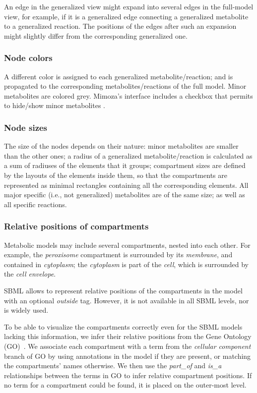 \documentclass{bmcart}
\begin{document}
An edge in the generalized view might expand into several edges in the full-model view, for example, if it is a generalized edge connecting a generalized metabolite to a generalized reaction. The positions of the edges after such an expansion might slightly differ from the corresponding generalized one.

\subsubsection*{Node colors}

A different color is assigned to each generalized metabolite/reaction; and is propagated to the corresponding metabolites/reactions of the full model. Minor metabolites are colored grey. Mimoza's interface includes a checkbox that permits to hide/show minor metabolites .

\subsubsection*{Node sizes}

The size of the nodes depends on their nature: minor metabolites are smaller than the other ones; a radius of a generalized metabolite/reaction is calculated as a sum of radiuses of the elements that it groups; compartment sizes are defined by the layouts of the elements inside them, so that the compartments are represented as minimal rectangles containing all the corresponding elements. All major specific (i.e., not generalized) metabolites are of the same size; as well as all specific reactions.

\subsubsection*{Relative positions of compartments}
Metabolic models may include several compartments, nested into each other. For example, the \emph{peroxisome} compartment is surrounded by its \emph{membrane}, and contained in \emph{cytoplasm}; the \emph{cytoplasm} is part of the \emph{cell}, which is surrounded by the \emph{cell envelope}.

SBML allows to represent relative positions of the compartments in the model with an optional \emph{outside} tag. However, it is not available in all SBML levels, nor is widely used.

To be able to visualize the compartments correctly even for the SBML models lacking this information, we infer their relative positions from the Gene Ontology (GO)~\cite{Ashburner2000}. We associate each compartment with a term from the \emph{cellular component} branch of GO by using annotations in the model if they are present, or matching the compartments' names otherwise. We then use the \emph{part\_of} and \emph{is\_a} relationships between the terms in GO to infer relative compartment positions. If no term for a compartment could be found, it is placed on the outer-most level. 
\end{document}
